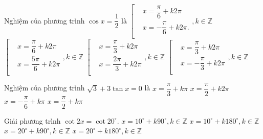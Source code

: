 \begin{ex}%
	Nghiệm của phương trình $\cos x=\dfrac{1}{2}$ là
	\choice
	{\True $\left[ \begin{aligned}
		  & x=\dfrac{\pi }{6}+k2\pi  \\ 
		 & x=-\dfrac{\pi }{6}+k2\pi . \\ 
		\end{aligned} \right.,k\in \mathbb{Z}$}
	{$\left[ \begin{aligned}
		  & x=\dfrac{\pi }{6}+k2\pi  \\ 
		 & x=\dfrac{5\pi }{6}+k2\pi  \\ 
		\end{aligned} \right.,k\in \mathbb{Z}$}
	{$\left[ \begin{aligned}
		  & x=\dfrac{\pi }{3}+k2\pi  \\ 
		 & x=\dfrac{2\pi }{3}+k2\pi  \\ 
		\end{aligned} \right.,k\in \mathbb{Z}$}
	{$\left[ \begin{aligned}
		  & x=\dfrac{\pi }{3}+k2\pi  \\ 
		 & x=-\dfrac{\pi }{3}+k2\pi  \\ 
		\end{aligned} \right.,k\in \mathbb{Z}$}
	\loigiai{
		Ta có $\cos x=\dfrac{1}{2}\Leftrightarrow \cos x=\cos \dfrac{\pi }{6}\Leftrightarrow \left[ \begin{aligned}
			  & x=\dfrac{\pi }{6}+k2\pi  \\ 
			 & x=-\dfrac{\pi }{6}+k2\pi  \\ 
			\end{aligned} \right.,k\in \mathbb{Z}$.
	}
\end{ex}

\begin{ex}%
	Nghiệm của phương trình $\sqrt{3}+3\tan x=0$ là
	\choice
	{$x=\dfrac{\pi }{3}+k\pi $}
	{$x=\dfrac{\pi }{2}+k2\pi $}
	{\True $x=-\dfrac{\pi }{6}+k\pi $}
	{$x=\dfrac{\pi }{2}+k\pi $}
\end{ex}

\begin{ex}%
	Giải phương trình $\cot 2x=\cot 20^\circ $.	
	\choice
	{\True $x=10^\circ +k90^\circ ,k\in \mathbb{Z}$}
	{$x=10^\circ +k180^\circ ,k\in \mathbb{Z}$}
	{$x=20^\circ +k90^\circ ,k\in \mathbb{Z}$}
	{$x=20^\circ +k180^\circ ,k\in \mathbb{Z}$}
\end{ex}

